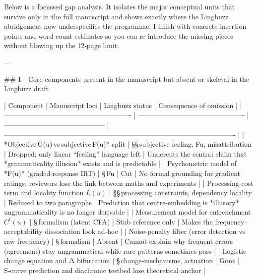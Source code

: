 Below is a focussed gap analysis.  It isolates the major conceptual units that survive only in the full manuscript and shows exactly where the Lingbuzz abridgement now underspecifies the programme.  I finish with concrete insertion points and word‑count estimates so you can re‑introduce the missing pieces without blowing up the 12‑page limit.

---

## 1 Core components present in the manuscript but absent or skeletal in the Lingbuzz draft

| Component                                               | Manuscript loci                                | Lingbuzz status                              | Consequence of omission                                                                              |
| ------------------------------------------------------- | ---------------------------------------------- | -------------------------------------------- | ---------------------------------------------------------------------------------------------------- |
| *Objective G(u) vs subjective F(u)* split               | §§ subjective feeling, Fu, misattribution      | Dropped; only linear “feeling” language left | Undercuts the central claim that *grammaticality illusion* exists and is predictable                 |
| Psychometric model of *F(u)* (graded‑response IRT)      | § Fu                                           | Cut                                          | No formal grounding for gradient ratings; reviewers lose the link between maths and experiments      |
| Processing‑cost term and locality function $L(u)$       | §§ processing constraints, dependency locality | Reduced to two paragraphs                    | Prediction that centre‑embedding is *illusory* ungrammaticality is no longer derivable               |
| Measurement model for entrenchment $C^t(u)$             | § formalism (latent CFA)                       | Stub reference only                          | Makes the frequency–acceptability dissociation look ad‑hoc                                           |
| Noise‑penalty filter (error detection vs raw frequency) | § formalism                                    | Absent                                       | Cannot explain why frequent errors (agreement) stay ungrammatical while rare patterns sometimes pass |
| Logistic change equation and Δ bifurcation              | § change‑mechanisms, actuation                 | Gone                                         | S‑curve prediction and diachronic testbed lose theoretical anchor                                    |
